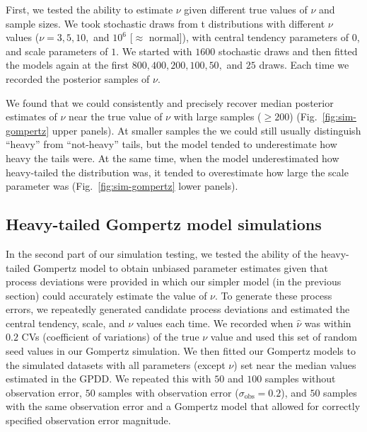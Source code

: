 First, we tested the ability to estimate $\nu$ given different true values of
$\nu$ and sample sizes. We took stochastic draws from t distributions with
different $\nu$ values ($\nu = 3, 5, 10,$ and $10^6$ [$\approx$ normal]), with
central tendency parameters of $0$, and scale parameters of $1$. We started with
$1600$ stochastic draws and then fitted the models again at the first $800, 400,
200, 100, 50,$ and $25$ draws. Each time we recorded the posterior samples of
$\nu$.

We found that we could consistently and precisely recover median posterior
estimates of $\nu$ near the true value of $\nu$ with large samples ($\ge 200$)
(Fig.~\ref{fig:sim-gompertz} upper panels). At smaller samples the we could
still usually distinguish ``heavy'' from ``not-heavy'' tails, but the model
tended to underestimate how heavy the tails were. At the same time, when the
model underestimated how heavy-tailed the distribution was, it tended to
overestimate how large the scale parameter was (Fig.~\ref{fig:sim-gompertz}
lower panels).

\subsection{Heavy-tailed Gompertz model simulations}

In the second part of our simulation testing, we tested the ability of the
heavy-tailed Gompertz model to obtain unbiased parameter estimates given that
process deviations were provided in which our simpler model (in the previous
section) could accurately estimate the value of $\nu$. To generate these process
errors, we repeatedly generated candidate process deviations and estimated the
central tendency, scale, and $\nu$ values each time. We recorded when
$\hat{\nu}$ was within $0.2$ CVs (coefficient of variations) of the true $\nu$
value and used this set of random seed values in our Gompertz simulation. We
then fitted our Gompertz models to the simulated datasets with all parameters
(except $\nu$) set near the median values estimated in the GPDD. We repeated
this with $50$ and $100$ samples without observation error, $50$ samples with
observation error ($\sigma_\mathrm{obs} = 0.2$), and $50$ samples with the same
observation error and a Gompertz model that allowed for correctly specified
observation error magnitude.

